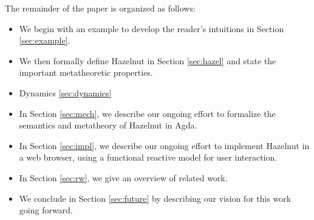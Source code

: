 The remainder of the paper is organized as follows:
\begin{itemize}
  \item We begin with an example to develop the reader's intuitions in Section
    \ref{sec:example}.

  \item We then formally define Hazelnut in Section \ref{sec:hazel} and state the important metatheoretic properties.
  \item Dynamics \ref{sec:dynamics}

  \item In Section \ref{sec:mech}, we describe our ongoing effort to formalize the semantics and metatheory of Hazelnut in Agda.

  \item In Section \ref{sec:impl}, we describe our ongoing effort to implement Hazelnut in a web browser, using a functional reactive model for user interaction.
  \item In Section \ref{sec:rw}, we give an overview of related work.
  \item We conclude in Section \ref{sec:future} by describing our vision for this work going 
    forward.
\end{itemize}
